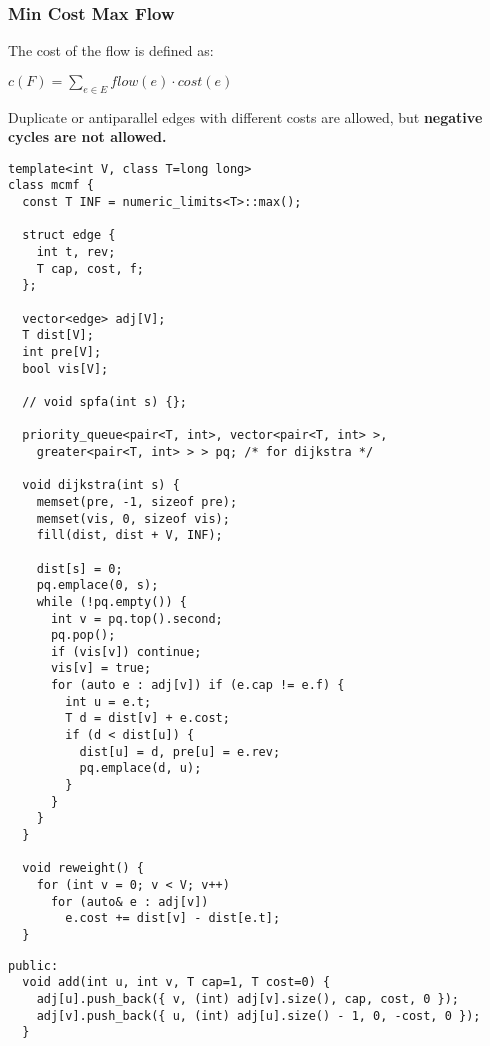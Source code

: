 \subsubsection{Min Cost Max Flow}

The cost of the flow is defined as:
\begin{center}
  $\displaystyle c(F) = \sum_{e \in E}^{} flow(e) \cdot cost(e)$
\end{center}

Duplicate or antiparallel edges with different costs are allowed, but \textbf{negative cycles are not allowed.}

\begin{center}
\begin{minipage}[t]{0.45\linewidth}
\begin{lstlisting}
template<int V, class T=long long>
class mcmf {
  const T INF = numeric_limits<T>::max();

  struct edge {
    int t, rev;
    T cap, cost, f;
  };

  vector<edge> adj[V];
  T dist[V];
  int pre[V];
  bool vis[V];

  // void spfa(int s) {};

  priority_queue<pair<T, int>, vector<pair<T, int> >,
    greater<pair<T, int> > > pq; /* for dijkstra */

  void dijkstra(int s) {
    memset(pre, -1, sizeof pre);
    memset(vis, 0, sizeof vis);
    fill(dist, dist + V, INF);

    dist[s] = 0;
    pq.emplace(0, s);
    while (!pq.empty()) {
      int v = pq.top().second;
      pq.pop();
      if (vis[v]) continue;
      vis[v] = true;
      for (auto e : adj[v]) if (e.cap != e.f) {
        int u = e.t;
        T d = dist[v] + e.cost;
        if (d < dist[u]) {
          dist[u] = d, pre[u] = e.rev;
          pq.emplace(d, u);
        }
      }
    }
  }

  void reweight() {
    for (int v = 0; v < V; v++)
      for (auto& e : adj[v])
        e.cost += dist[v] - dist[e.t];
  }
\end{lstlisting}
\end{minipage}
\qquad
\begin{minipage}[t]{0.45\linewidth}
\begin{lstlisting}
public:
  void add(int u, int v, T cap=1, T cost=0) {
    adj[u].push_back({ v, (int) adj[v].size(), cap, cost, 0 });
    adj[v].push_back({ u, (int) adj[u].size() - 1, 0, -cost, 0 });
  }


\end{lstlisting}
\end{minipage}
\end{center}
